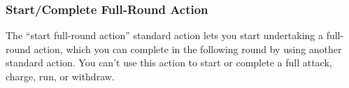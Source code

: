 \subsubsection{Start/Complete Full-Round Action}
The ``start full-round action'' standard action lets you start undertaking a full-round action, which you can complete in the following round by using another standard action. You can't use this action to start or complete a full attack, charge, run, or withdraw.